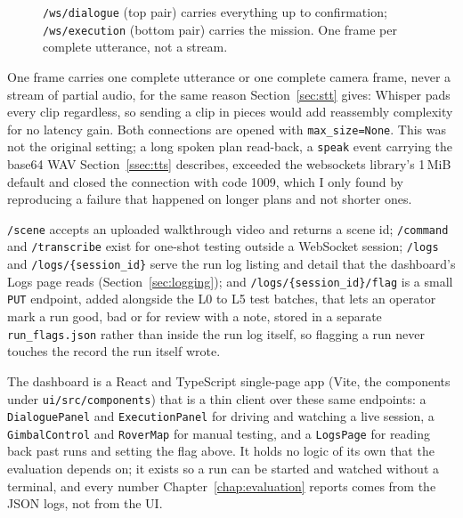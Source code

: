 \begin{figure}[htbp]
  \centering
  \caption{\texttt{/ws/dialogue} (top pair) carries everything up to confirmation; \texttt{/ws/execution} (bottom pair) carries the mission. One frame per complete utterance, not a stream.}
  \label{fig:protocol}
\end{figure}

One frame carries one complete utterance or one complete camera frame, never a
stream of partial audio, for the same reason Section~\ref{sec:stt} gives:
Whisper pads every clip regardless, so sending a clip in pieces would add
reassembly complexity for no latency gain. Both connections are opened with
\texttt{max\_size=None}. This was not the original setting; a long spoken plan
read-back, a \texttt{speak} event carrying the base64 WAV Section~\ref{ssec:tts}
describes, exceeded the websockets library's 1\,MiB default and closed the
connection with code 1009, which I only found by reproducing a failure that
happened on longer plans and not shorter ones.

\texttt{/scene} accepts an uploaded walkthrough video and returns a scene id;
\texttt{/command} and \texttt{/transcribe} exist for one-shot testing outside a
WebSocket session; \texttt{/logs} and \texttt{/logs/\{session\_id\}} serve the run
log listing and detail that the dashboard's Logs page reads
(Section~\ref{sec:logging}); and \texttt{/logs/\{session\_id\}/flag} is a small
\texttt{PUT} endpoint, added alongside the L0 to L5 test batches, that lets an
operator mark a run good, bad or for review with a note, stored in a separate
\texttt{run\_flags.json} rather than inside the run log itself, so flagging a run
never touches the record the run itself wrote.

The dashboard is a React and TypeScript single-page app (Vite, the components
under \texttt{ui/src/components}) that is a thin client over these same
endpoints: a \texttt{DialoguePanel} and \texttt{ExecutionPanel} for driving and
watching a live session, a \texttt{GimbalControl} and \texttt{RoverMap} for
manual testing, and a \texttt{LogsPage} for reading back past runs and setting
the flag above. It holds no logic of its own that the evaluation depends on; it
exists so a run can be started and watched without a terminal, and every number
Chapter~\ref{chap:evaluation} reports comes from the JSON logs, not from the UI.

